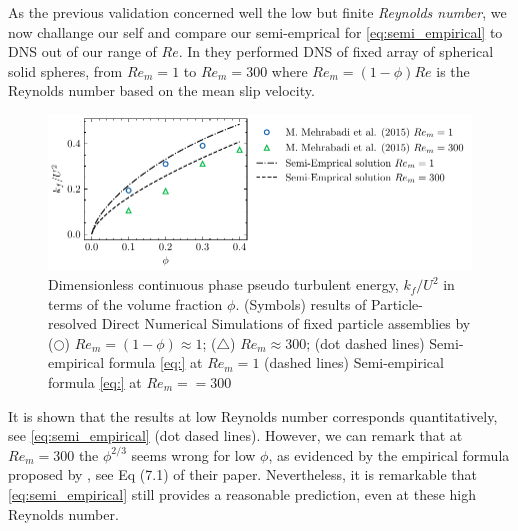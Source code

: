 As the previous validation concerned well the low but finite \textit{Reynolds number}, we now challange our self and compare our semi-emprical for \ref{eq:semi_empirical} to DNS out of our range of $Re$. 
In \citet{mehrabadi2015pseudo} they performed DNS of fixed array of spherical solid spheres, from $Re_m = 1$ to $Re_m=300$ where $Re_m = (1- \phi) Re$ is the Reynolds number based on the mean slip velocity. 
\begin{figure}
    \centering
    \includegraphics[height = 0.25\textwidth]{image/HOMOGENEOUS_final/CA/tenneti.pdf}
    \caption{Dimensionless continuous phase pseudo turbulent energy, $k_f/U^2$ in terms of the volume fraction $\phi$.
    (Symbols) 
    results of Particle-resolved Direct Numerical Simulations
    of fixed particle assemblies by \citet{mehrabadi2015pseudo}
    ($\pmb\bigcirc$) $Re_m = (1-\phi) \approx 1$; ($\pmb\triangle$) $Re_m \approx 300$;
    (dot dashed lines) Semi-empirical formula \ref{eq:} at $Re_m = 1$
    (dashed lines) Semi-empirical formula \ref{eq:} at $Re_m= = 300$
    }
    \label{fig:tennet}
\end{figure}
It is shown that the results at low Reynolds number corresponds quantitatively, see \ref{eq:semi_empirical} (dot dased lines). 
However, we can remark that at $Re_m = 300$ the $\phi^{2/3}$ seems wrong for low $\phi$, as evidenced by the empirical formula proposed by \citet{mehrabadi2015pseudo}, see Eq (7.1) of their paper. 
Nevertheless, it is remarkable that \ref{eq:semi_empirical} still provides a reasonable prediction, even at these high Reynolds number. 


